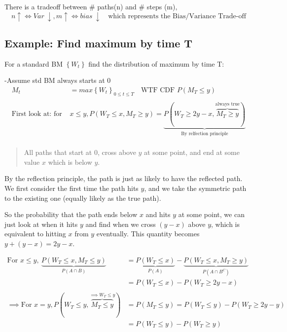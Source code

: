 \documentclass[
  oneside]{book}
\begin{document}
There is a tradeoff between \# paths(n) and \# steps (m),
\[
n \uparrow \iff Var\ \downarrow, m \uparrow \iff bias \ \downarrow \quad \text{which represents the Bias/Variance Trade-off}
\]

\hypertarget{example-find-maximum-by-time-t}{%
\subsection{Example: Find maximum by time T}\label{example-find-maximum-by-time-t}}

For a standard BM \(\left\{ W_{t} \right\}\) find the distribution of maximum by time T:

-Assume std BM always starts at 0
\[
\begin{aligned}
M_{t} &= max\left\{ W_{t} \right\} _{0\leq t\leq T}\quad \text{WTF CDF }P(M_{T}\leq y)\\
\\
\text{First look at: for }& x\leq y, P(W_{T}\leq x, M_{T}\geq y) = \underbrace{ P(W_{T}\geq 2y-x, \overbrace{ M_{T}\geq y }^{ \text{always true} }) }_{\text{By relfection principle} }\\
\end{aligned}
\]

\begin{quote}
All paths that start at 0, cross above \(y\) at some point, and end at some value \(x\) which is below \(y\).
\end{quote}

By the reflection principle, the path is just as likely to have the reflected path.
We first consider the first time the path hits \(y\), and we take the symmetric path to the existing one (equally likely as the true path).

So the probability that the path ends below \(x\) and hits \(y\) at some point, we can just look at when it hits \(y\) and find when we cross \((y-x)\) above \(y\), which is equivalent to hitting \(x\) from \(y\) eventually. This quantity becomes \(y+(y-x) = 2y-x\).

\[
\begin{aligned}
\text{For } x\leq y,\  \underbrace{ P(W_{T}\leq x, M_{T}\leq y) }_{ P(A \cap B) } &= \underbrace{ P(W_{T}\leq x) }_{ P(A) } - \underbrace{ P(W_{T}\leq x, M_{T}\geq y) }_{ P(A \cap B^{C}) } \\
&= P(W_{T}\leq x) - P(W_{T}\geq 2y-x)\\
\\
\implies \text{For } x=y, P(W_{T}\leq y, \overbrace{ M_{T}\leq y }^{ \implies W_{T} \leq y }) &= P(M_{T}\leq y) = P(W_{T}\leq y) - P(W_{T}\geq 2y-y)\\
&= P(W_{T}\leq y)-P(W_{T}\geq y)
\end{aligned}
\]
\end{document}
